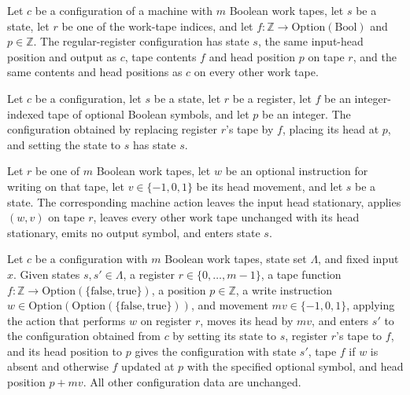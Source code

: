 \begin{definition}
\label{Complexity.LogProg.regCfg}
\leanok
{}
Let $c$ be a configuration of a machine with $m$ Boolean work tapes, let $s$ be a state,
let $r$ be one of the work-tape indices, and let
$f\colon\mathbb{Z}\to\mathrm{Option}(\mathrm{Bool})$ and $p\in\mathbb{Z}$. The
regular-register configuration has state $s$, the same input-head position and output as
$c$, tape contents $f$ and head position $p$ on tape $r$, and the same contents and head
positions as $c$ on every other work tape.
\end{definition}

\begin{lemma}
\label{Complexity.LogProg.regCfg_state}
\leanok
{}
Let $c$ be a configuration, let $s$ be a state, let $r$ be a register, let $f$ be an
integer-indexed tape of optional Boolean symbols, and let $p$ be an integer. The
configuration obtained by replacing register $r$'s tape by $f$, placing its head at $p$,
and setting the state to $s$ has state $s$.
\end{lemma}

\begin{definition}
\label{Complexity.LogProg.regAct}
\leanok
{}
Let $r$ be one of $m$ Boolean work tapes, let $w$ be an optional instruction for writing
on that tape, let $v\in\{-1,0,1\}$ be its head movement, and let $s$ be a state. The
corresponding machine action leaves the input head stationary, applies $(w,v)$ on tape
$r$, leaves every other work tape unchanged with its head stationary, emits no output
symbol, and enters state $s$.
\end{definition}

\begin{lemma}
\label{Complexity.LogProg.apply_regAct}
\leanok
{}
Let $c$ be a configuration with $m$ Boolean work tapes, state set $\Lambda$, and fixed
input $x$. Given states $s,s'\in\Lambda$, a register $r\in\{0,\ldots,m-1\}$, a tape
function $f:\mathbb Z\to\mathrm{Option}(\{\mathrm{false},\mathrm{true}\})$, a position
$p\in\mathbb Z$, a write instruction
$w\in\mathrm{Option}(\mathrm{Option}(\{\mathrm{false},\mathrm{true}\}))$, and movement
$mv\in\{-1,0,1\}$, applying the action that performs $w$ on register $r$, moves its head
by $mv$, and enters $s'$ to the configuration obtained from $c$ by setting its state to
$s$, register $r$'s tape to $f$, and its head position to $p$ gives the configuration
with state $s'$, tape $f$ if $w$ is absent and otherwise $f$ updated at $p$ with the
specified optional symbol, and head position $p+mv$. All other configuration data are
unchanged.
\end{lemma}

